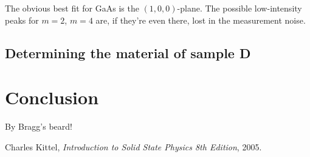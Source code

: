 \documentclass[a4paper,twoside=false,abstract=false,numbers=noenddot,
titlepage=false,headings=small,parskip=half,version=last]{scrartcl}
\begin{document}
The obvious best fit for GaAs is the $(1,0,0)$-plane.
The possible low-intensity peaks for $m=2$, $m=4$ are, if they're even there, lost in the measurement noise.


\subsection{Determining the material of sample D}

\section{Conclusion}

By Bragg's beard!

\begin{thebibliography}{1}
        Charles Kittel,
        {\em Introduction to Solid State Physics 8th Edition},
        2005.
\end{thebibliography}
\end{document}
